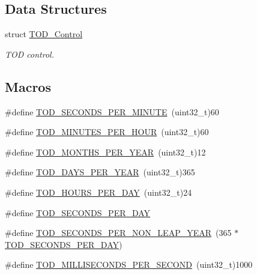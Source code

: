 \subsection*{Data Structures}
\begin{DoxyCompactItemize}
\item 
struct \mbox{\hyperlink{structTOD__Control}{T\+O\+D\+\_\+\+Control}}
\begin{DoxyCompactList}\small\item\em T\+OD control. \end{DoxyCompactList}\end{DoxyCompactItemize}
\subsection*{Macros}
\begin{DoxyCompactItemize}
\item 
\#define \mbox{\hyperlink{group__RTEMSScoreTOD_ga59d0190424f2881828ba7bb02d9d5148}{T\+O\+D\+\_\+\+S\+E\+C\+O\+N\+D\+S\+\_\+\+P\+E\+R\+\_\+\+M\+I\+N\+U\+TE}}~(uint32\+\_\+t)60
\item 
\#define \mbox{\hyperlink{group__RTEMSScoreTOD_ga077821b8d136ad62d2f9b4352cf3436f}{T\+O\+D\+\_\+\+M\+I\+N\+U\+T\+E\+S\+\_\+\+P\+E\+R\+\_\+\+H\+O\+UR}}~(uint32\+\_\+t)60
\item 
\#define \mbox{\hyperlink{group__RTEMSScoreTOD_gaa12f08e6cc5fdbc7c3ae82c551e61315}{T\+O\+D\+\_\+\+M\+O\+N\+T\+H\+S\+\_\+\+P\+E\+R\+\_\+\+Y\+E\+AR}}~(uint32\+\_\+t)12
\item 
\#define \mbox{\hyperlink{group__RTEMSScoreTOD_ga27b62f5494a5cb908c2c3ef6f14bc459}{T\+O\+D\+\_\+\+D\+A\+Y\+S\+\_\+\+P\+E\+R\+\_\+\+Y\+E\+AR}}~(uint32\+\_\+t)365
\item 
\#define \mbox{\hyperlink{group__RTEMSScoreTOD_gaedf73c32dd63f856df47e26052f62410}{T\+O\+D\+\_\+\+H\+O\+U\+R\+S\+\_\+\+P\+E\+R\+\_\+\+D\+AY}}~(uint32\+\_\+t)24
\item 
\#define \mbox{\hyperlink{group__RTEMSScoreTOD_gac064f77025e49ee110224ebde3fc72e7}{T\+O\+D\+\_\+\+S\+E\+C\+O\+N\+D\+S\+\_\+\+P\+E\+R\+\_\+\+D\+AY}}
\item 
\#define \mbox{\hyperlink{group__RTEMSScoreTOD_ga645242ab0b8238dbeb24659653c99961}{T\+O\+D\+\_\+\+S\+E\+C\+O\+N\+D\+S\+\_\+\+P\+E\+R\+\_\+\+N\+O\+N\+\_\+\+L\+E\+A\+P\+\_\+\+Y\+E\+AR}}~(365 $\ast$ \mbox{\hyperlink{group__RTEMSScoreTOD_gac064f77025e49ee110224ebde3fc72e7}{T\+O\+D\+\_\+\+S\+E\+C\+O\+N\+D\+S\+\_\+\+P\+E\+R\+\_\+\+D\+AY}})
\item 
\#define \mbox{\hyperlink{group__RTEMSScoreTOD_gaacf9a11c2eb518ce004371fbb6b7899c}{T\+O\+D\+\_\+\+M\+I\+L\+L\+I\+S\+E\+C\+O\+N\+D\+S\+\_\+\+P\+E\+R\+\_\+\+S\+E\+C\+O\+ND}}~(uint32\+\_\+t)1000

\end{DoxyCompactItemize}
